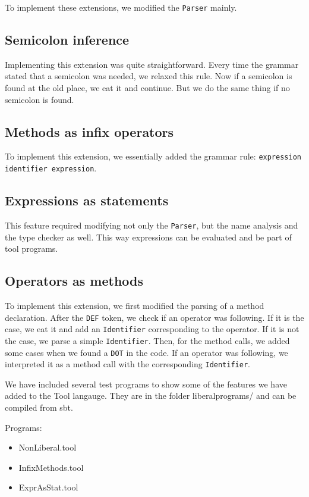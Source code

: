 To implement these extensions, we modified the \lstinline$Parser$ mainly.

\subsection{Semicolon inference}
Implementing this extension was quite straightforward. Every time the grammar stated that a semicolon was needed, we relaxed this rule. Now if a semicolon is found at the old place, we eat it and continue. But we do the same thing if no semicolon is found.

\subsection{Methods as infix operators}
To implement this extension, we essentially added the grammar rule: \lstinline$expression identifier expression$. 

\subsection{Expressions as statements}
This feature required modifying not only the \lstinline$Parser$, but the name analysis and the type checker as well. This way expressions can be evaluated and be part of tool programs.

\subsection{Operators as methods}
To implement this extension, we first modified the parsing of a method declaration. After the \lstinline$DEF$ token, we check if an operator was following. If it is the case, we eat it and add an \lstinline$Identifier$ corresponding to the operator. If it is not the case, we parse a simple \lstinline$Identifier$. Then, for the method calls, we added some cases when we found a \lstinline$DOT$ in the code. If an operator was following, we interpreted it as a method call with the corresponding \lstinline$Identifier$.

\vspace{1cm}

We have included several test programs to show some of the features we have added to the Tool langauge. They are in the folder liberalprograms/ and can be compiled from sbt.

Programs:

\begin{itemize}
    \item NonLiberal.tool
    \item InfixMethods.tool
    \item ExprAsStat.tool
\end{itemize}
